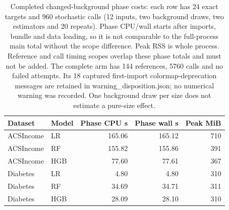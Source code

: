 \begin{table}[tb]
\centering
\caption{Completed changed-background phase costs: each row has 24 exact targets and 960 stochastic calls (12 inputs, two background draws, two estimators and 20 repeats). Phase CPU/wall starts after imports, bundle and data loading, so it is not comparable to the full-process main total without the scope difference. Peak RSS is whole process. Reference and call timing scopes overlap these phase totals and must not be added. The complete arm has 144 references, 5760 calls and no failed attempts. Its 18 captured first-import colormap-deprecation messages are retained in warning\_disposition.json; no numerical warning was recorded. One background draw per size does not estimate a pure-size effect.}
\label{tab:background-compute}
\small
\begin{tabular}{llrrr}
\toprule
Dataset & Model & Phase CPU s & Phase wall s & Peak MiB \\
\midrule
ACSIncome & LR & 165.06 & 165.12 & 710 \\
ACSIncome & RF & 155.82 & 155.86 & 391 \\
ACSIncome & HGB & 77.60 & 77.61 & 367 \\
Diabetes & LR & 4.80 & 4.80 & 310 \\
Diabetes & RF & 34.69 & 34.71 & 311 \\
Diabetes & HGB & 28.09 & 28.10 & 310 \\
\bottomrule
\end{tabular}
\end{table}
